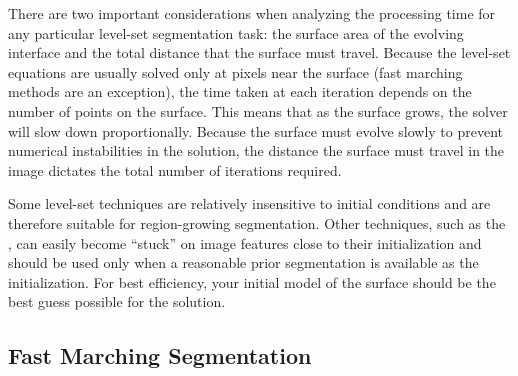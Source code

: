 There are two important considerations when analyzing the processing time for
any particular level-set segmentation task: the surface area of the evolving
interface and the total distance that the surface must travel.  Because the
level-set equations are usually solved only at pixels near the surface (fast
marching methods are an exception), the time taken at each iteration depends on
the number of points on the surface.  This means that as the surface grows, the
solver will slow down proportionally.  Because the surface must evolve slowly
to prevent numerical instabilities in the solution, the distance the surface
must travel in the image dictates the total number of iterations required.

Some level-set techniques are relatively insensitive to initial conditions
and are therefore suitable for region-growing segmentation. Other techniques,
such as the , can easily
become ``stuck'' on image features close to their initialization and should
be used only when a reasonable prior segmentation is available as the
initialization.  For best efficiency, your initial model of the surface
should be the best guess possible for the solution. 


\subsection{Fast Marching Segmentation}
\label{sec:FastMarchingImageFilter}

\ifitkFullVersion

\fi










